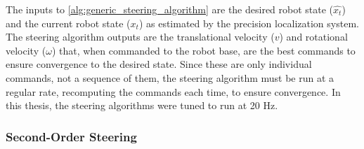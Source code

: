 The inputs to \autoref{alg:generic_steering_algorithm} are the desired robot state ($\hat{x_t}$) and the current robot state ($x_t$) as estimated by the precision localization system. The steering algorithm outputs are the translational velocity ($v$) and rotational velocity ($\omega$) that, when commanded to the robot base, are the best commands to ensure convergence to the desired state. Since these are only individual commands, not a sequence of them, the steering algorithm must be run at a regular rate, recomputing the commands each time, to ensure convergence. In this thesis, the steering algorithms were tuned to run at 20 Hz.

\subsubsection{Second-Order Steering}\label{subsubsec:second_order_steering}



\begin{comment}
This section details the steering algorithms used by this precision navigation stack

Specifically, the following will be discussed:
\begin{enumerate}
\item Second Order steering
\item Phase Space steering
\item Lfollow for both linear paths and spin in places
	Need to mention the interaction with the PID time constants and such
\item Added a spin in place segment descriptor because of instabilities in the tiny arcs
\end{enumerate}

\end{comment}